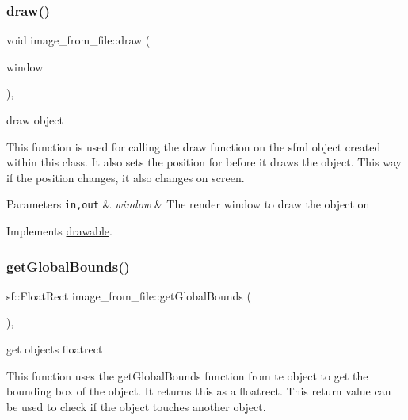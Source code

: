 \subsubsection{\texorpdfstring{draw()}{draw()}}
{\footnotesize\ttfamily void image\+\_\+from\+\_\+file\+::draw (\begin{DoxyParamCaption}\item[{sf\+::\+Render\+Window \&}]{window }\end{DoxyParamCaption})\hspace{0.3cm}{\ttfamily [override]}, {\ttfamily [virtual]}}



draw object 

This function is used for calling the draw function on the sfml object created within this class. It also sets the position for before it draws the object. This way if the position changes, it also changes on screen.


\begin{DoxyParams}[1]{Parameters}
\mbox{\tt in,out}  & {\em window} & The render window to draw the object on \\
\hline
\end{DoxyParams}


Implements \hyperlink{classdrawable_a4e49e2c1121704c83ce24c5f48dd910f}{drawable}.

\mbox{\label{classimage__from__file_a971a591f906fa5c6e85b4e32cfc3d6a0}} 
\subsubsection{\texorpdfstring{get\+Global\+Bounds()}{getGlobalBounds()}}
{\footnotesize\ttfamily sf\+::\+Float\+Rect image\+\_\+from\+\_\+file\+::get\+Global\+Bounds (\begin{DoxyParamCaption}{ }\end{DoxyParamCaption})\hspace{0.3cm}{\ttfamily [override]}, {\ttfamily [virtual]}}



get objects floatrect 

This function uses the get\+Global\+Bounds function from te object to get the bounding box of the object. It returns this as a floatrect. This return value can be used to check if the object touches another object.


